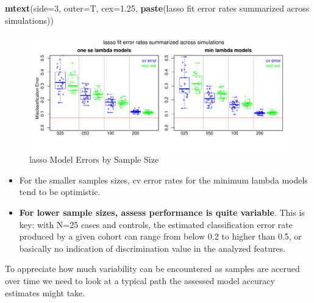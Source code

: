 \documentclass[
]{book}
\newenvironment{Shaded}{\begin{snugshade}}{\end{snugshade}}
\newcommand{\DataTypeTok}[1]{\textcolor[rgb]{0.13,0.29,0.53}{#1}}
\newcommand{\DecValTok}[1]{\textcolor[rgb]{0.00,0.00,0.81}{#1}}
\newcommand{\FloatTok}[1]{\textcolor[rgb]{0.00,0.00,0.81}{#1}}
\newcommand{\KeywordTok}[1]{\textcolor[rgb]{0.13,0.29,0.53}{\textbf{#1}}}
\newcommand{\NormalTok}[1]{#1}
\newcommand{\StringTok}[1]{\textcolor[rgb]{0.31,0.60,0.02}{#1}}
\begin{document}
\begin{Shaded}
\begin{Highlighting}[]
\KeywordTok{mtext}\NormalTok{(}\DataTypeTok{side=}\DecValTok{3}\NormalTok{, }\DataTypeTok{outer=}\NormalTok{T, }\DataTypeTok{cex=}\FloatTok{1.25}\NormalTok{, }\KeywordTok{paste}\NormalTok{(}\StringTok{\textquotesingle{}lasso fit error rates summarized across simulations\textquotesingle{}}\NormalTok{))}
\end{Highlighting}
\end{Shaded}

\begin{figure}
\centering
\includegraphics{Static/figures/hcc5hmC-glmnetSuite-lasso-simRes-errors-overSim-1.pdf}
\caption{\label{fig:hcc5hmC-glmnetSuite-lasso-simRes-errors-overSim}lasso Model Errors by Sample Size}
\end{figure}

\begin{itemize}
\item
  For the smaller samples sizes, cv error rates for the minimum lambda models tend to be
  optimistic.
\item
  \textbf{For lower sample sizes, assess performance is quite variable}. This
  is key: with N=25 cases and controls, the estimated classification error
  rate produced by a given cohort can range from below 0.2 to higher than 0.5,
  or basically no indication of discrimination value in the analyzed features.
\end{itemize}

To appreciate how much variability can be encountered as samples are accrued over time
we need to look at a typical path the assessed model accuracy estimates might take.
\end{document}
